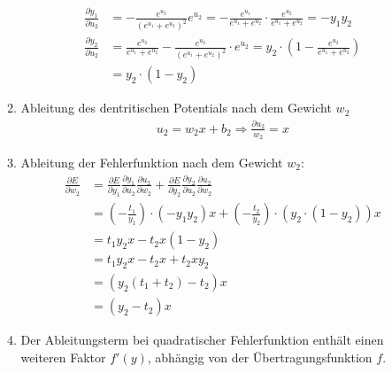 \documentclass{article}
\begin{document}
\begin{enumerate}
\begin{enumerate}[label= \alph*)]
                \begin{align*}
                  \frac{\partial y_1}{\partial u_2} & = - \frac{e^{u_2}}{(e^{u_1}+e^{u_2})^2} e^{u_2} = - \frac{e^{u_1}}{e^{u_1} + e^{u_2}} \cdot \frac{e^{u_2}}{e^{u_1} + e^{u_2}} = -y_1 y_2     \\
                  \frac{\partial y_2}{\partial u_2} & = \frac{e^{u_2}}{e^{u_1} + e^{u_2}} - \frac{e^{u_2}}{(e^{u_1} + e^{u_2})^2} \cdot e^{u_2} = y_2 \cdot (1- \frac{e^{u_2}}{e^{u_1} + e^{u_2}}) \\
                                                    & = y_2 \cdot (1- y_2)
                \end{align*}
          \item Ableitung des dentritischen Potentials nach dem Gewicht $w_2$
                \begin{align*}
                  u_2 = w_2 x + b_2 \Rightarrow \frac{\partial u_2}{w_2} = x
                \end{align*}
          \item Ableitung der Fehlerfunktion nach dem Gewicht $w_2$:
                \begin{align*}
                  \frac{\partial E }{\partial w_2} & = \frac{\partial E }{\partial y_1}\frac{\partial y_1}{\partial u_2}\frac{\partial u_2 }{\partial w_2}+\frac{\partial E}{\partial y_2}\frac{\partial y_2}{\partial u_2}\frac{\partial u_2}{\partial w_2} \\
                                                   & = (-\frac{t_1}{y_1})\cdot(-y_1 y_2)x + (-\frac{t_2}{y_2})\cdot (y_2 \cdot (1 - y_2)) x                                                                                                                  \\
                                                   & = t_1 y_2 x - t_2 x (1 - y_2)                                                                                                                                                                           \\
                                                   & = t_1 y_2 x - t_2 x + t_2 x y_2                                                                                                                                                                         \\
                                                   & = (y_2(t_1 + t_2) - t_2) x                                                                                                                                                                              \\
                                                   & = (y_2 - t_2) x
                \end{align*}

          \item Der Ableitungsterm bei quadratischer Fehlerfunktion enthält einen weiteren Faktor $f'(y)$, abhängig von der Übertragungsfunktion $f$.
        \end{enumerate}
\end{enumerate}
\end{document}

